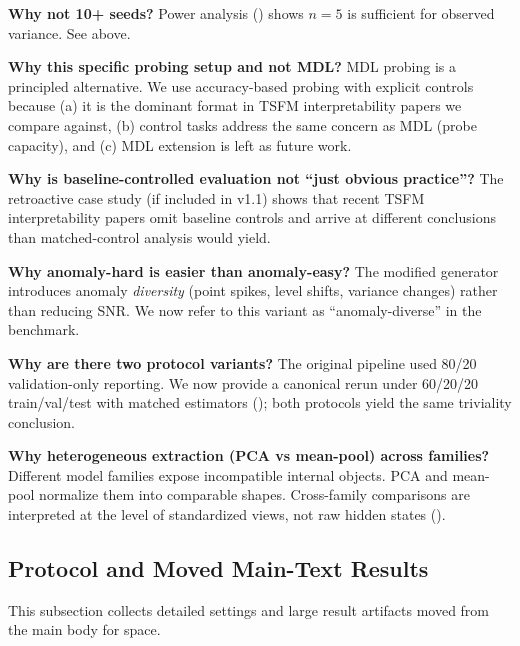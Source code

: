 \documentclass{article}
\begin{document}
\textbf{Why not 10+ seeds?} Power analysis () shows $n=5$ is sufficient for observed variance. See above.

\textbf{Why this specific probing setup and not MDL?} MDL probing \cite{Voita2020,Pimentel2020} is a principled alternative. We use accuracy-based probing with explicit controls because (a) it is the dominant format in TSFM interpretability papers we compare against, (b) control tasks address the same concern as MDL (probe capacity), and (c) MDL extension is left as future work.

\textbf{Why is baseline-controlled evaluation not ``just obvious practice''?} The retroactive case study (if included in v1.1) shows that recent TSFM interpretability papers omit baseline controls and arrive at different conclusions than matched-control analysis would yield.

\textbf{Why anomaly-hard is easier than anomaly-easy?} The modified generator introduces anomaly \emph{diversity} (point spikes, level shifts, variance changes) rather than reducing SNR. We now refer to this variant as ``anomaly-diverse'' in the benchmark.

\textbf{Why are there two protocol variants?} The original pipeline used 80/20 validation-only reporting. We now provide a canonical rerun under 60/20/20 train/val/test with matched estimators (); both protocols yield the same triviality conclusion.

\textbf{Why heterogeneous extraction (PCA vs mean-pool) across families?} Different model families expose incompatible internal objects. PCA and mean-pool normalize them into comparable shapes. Cross-family comparisons are interpreted at the level of standardized views, not raw hidden states ().

\subsection{Protocol and Moved Main-Text Results}
\label{sec:appendix_protocol_details}

This subsection collects detailed settings and large result artifacts moved from the main body for space.
\end{document}

